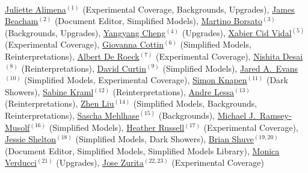 

\\

\noindent  \href{mailto:juliette.alimena@cern.ch}{Juliette Alimena}$^{(1)}$ (Experimental Coverage, Backgrounds, Upgrades), \href{mailto:j.beacham@cern.ch}{James Beacham}$^{(2)}$ (Document Editor, Simplified Models), \href{mailto:martino.borsato@cern.ch}{Martino Borsato}$^{(3)}$ (Backgrounds, Upgrades),
\href{mailto:yangyang.cheng@cornell.edu}{Yangyang Cheng}$^{(4)}$ (Upgrades), \href{mailto:xabier.cid.vidal@cern.ch}{Xabier Cid Vidal}$^{(5)}$ (Experimental Coverage), \href{mailto:gcottin@phys.ntu.edu.tw}{Giovanna Cottin}$^{(6)}$ (Simplified Models, Reinterpretations), \href{mailto:deroeck@mail.cern.ch}{Albert De Roeck}$^{(7)}$ (Experimental Coverage), \href{mailto:ddesai@theory.tifr.res.in}{Nishita Desai}$^{(8)}$ (Reinterpretations), \href{mailto:dcurtin@physics.utoronto.ca}{David Curtin}$^{(9)}$ (Simplified Models), \href{mailto:jaredaevans@gmail.com}{Jared A.~Evans}$^{(10)}$ (Simplified Models, Experimental Coverage), \href{mailto:knapen@ias.edu}{Simon Knapen}$^{(11)}$ (Dark Showers), \href{mailto:sabine.kraml@lpsc.in2p3.fr}{Sabine Kraml}$^{(12)}$ (Reinterpretations), \href{mailto:andre.lessa@ufabc.edu.br}{Andre Lessa}$^{(13)}$ (Reinterpretations),  \href{mailto:zliuphys@umd.edu}{Zhen Liu}$^{(14)}$ (Simplified Models, Backgrounds, Reinterpretations), \href{mailto:sascha.mehlhase@cern.ch}{Sascha Mehlhase}$^{(15)}$ (Backgrounds), \href{mailto:mjrm@physics.umass.edu}{Michael J.~Ramsey-Musolf}$^{(16)}$ (Simplified Models),
\href{mailto:hrussell@cern.ch}{Heather Russell}$^{(17)}$ (Experimental Coverage), \href{mailto:sheltonj@illinois.edu}{Jessie Shelton}$^{(18)}$ (Simplified Models, Dark Showers), \href{mailto:bshuve@g.hmc.edu}{Brian Shuve}$^{(19,20)}$ (Document Editor, Simplified Models, Simplified Models Library),  \href{mailto:monica.verducci@cern.ch}{Monica Verducci}$^{(21)}$ (Upgrades), \href{mailto:jose.zurita@kit.edu}{Jose Zurita}$^{(22,23)}$ (Experimental Coverage)\\

\vspace{1.5cm}



\\

